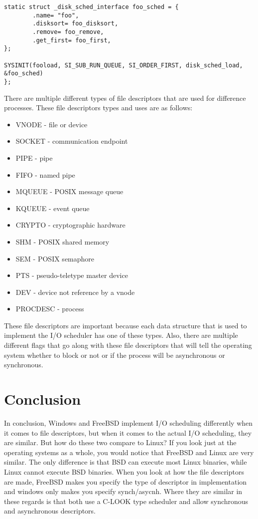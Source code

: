 \documentclass[letterpaper,10pt,titlepage,draftclsnofoot,onecolumn]{IEEEtran}
\begin{document}
\begin{lstlisting}
static struct _disk_sched_interface foo_sched = {
        .name= "foo",
        .disksort= foo_disksort,
        .remove= foo_remove,
        .get_first= foo_first,
};

SYSINIT(fooload, SI_SUB_RUN_QUEUE, SI_ORDER_FIRST, disk_sched_load, &foo_sched)
};
\end{lstlisting}\cite{FreeBSD2} 

There are multiple different types of file descriptors that are used for difference processes. These file descriptors types and uses are as follows:

\begin{itemize}
\item  VNODE - file or device
\item  SOCKET - communication endpoint
\item  PIPE - pipe
\item  FIFO - named pipe
\item  MQUEUE - POSIX message queue
\item  KQUEUE - event queue
\item  CRYPTO - cryptographic hardware
\item  SHM - POSIX shared memory
\item  SEM - POSIX semaphore
\item  PTS - pseudo-teletype master device
\item  DEV - device not reference by a vnode
\item  PROCDESC - process
\end{itemize}\cite{FreeBSD2} 

These file descriptors are important because each data structure that is used to implement the I/O scheduler has one of these types. Also, there are multiple different flags that go along with these file descriptors that will tell the operating system whether to block or not or if the process will be asynchronous or synchronous. 

\section{Conclusion}

In conclusion, Windows and FreeBSD implement I/O scheduling differently when it comes to file descriptors, but when it comes to the actual I/O scheduling, they are similar. But how do these two compare to Linux? If you look just at the operating systems as a whole, you would notice that FreeBSD and Linux are very similar. The only difference is that BSD can execute most Linux binaries, while Linux cannot execute BSD binaries. When you look at how the file descriptors are made, FreeBSD makes you specify the type of descriptor in implementation and windows only makes you specify synch/asycnh. Where they are similar in these regards is that both use a C-LOOK type scheduler and allow synchronous and asynchronous descriptors.  





\end{document}
